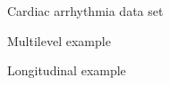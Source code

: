 \begin{frame}{Cardiac arrhythmia data set}
\end{frame}
\begin{frame}{Multilevel example}
\end{frame}
\begin{frame}{Longitudinal example}
\end{frame}